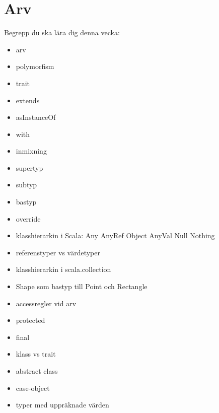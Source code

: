 \chapter{Arv}\label{chapter:W07}
Begrepp du ska lära dig denna vecka:
\begin{multicols}{2}\begin{itemize}[nosep,label={$\square$},leftmargin=*]
\item arv
\item polymorfism
\item trait
\item extends
\item asInstanceOf
\item with
\item inmixning
\item supertyp
\item subtyp
\item bastyp
\item override
\item klasshierarkin i Scala: Any AnyRef Object AnyVal Null Nothing
\item referenstyper vs värdetyper
\item klasshierarkin i scala.collection
\item Shape som bastyp till Point och Rectangle
\item accessregler vid arv
\item protected
\item final
\item klass vs trait
\item abstract class
\item case-object
\item typer med uppräknade värden\end{itemize}\end{multicols}
